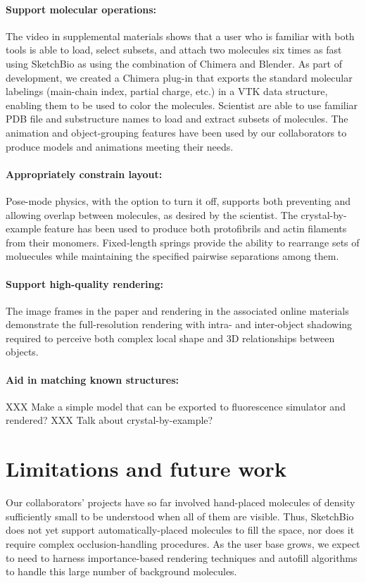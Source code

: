 \documentclass[twocolumn]{bmcart}%
\begin{document}
\paragraph*{Support molecular operations:}
The video in supplemental materials shows that a user who is familiar with both tools is able to load, select subsets, and attach two molecules six times as fast using SketchBio as using the combination of Chimera and Blender. As part of development, we created a Chimera plug-in that exports the standard molecular labelings (main-chain index, partial charge, etc.) in a VTK data structure, enabling them to be used to color the molecules. Scientist are able to use familiar PDB file and substructure names to load and extract subsets of molecules. The animation and object-grouping features have been used by our collaborators to produce models and animations meeting their needs.

\paragraph*{Appropriately constrain layout:}
Pose-mode physics, with the option to turn it off, supports both preventing and allowing overlap between molecules, as desired by the scientist. The crystal-by-example feature has been used to produce both protofibrils and actin filaments from their monomers. Fixed-length springs provide the ability to rearrange sets of moluecules while maintaining the specified pairwise separations among them.

\paragraph*{Support high-quality rendering:}
The image frames in the paper and rendering in the associated online materials demonstrate the full-resolution rendering with intra- and inter-object shadowing required to perceive both complex local shape and 3D relationships between objects.

\paragraph*{Aid in matching known structures:}
XXX Make a simple model that can be exported to fluorescence simulator and rendered?
XXX Talk about crystal-by-example?

\section*{Limitations and future work}
Our collaborators' projects have so far involved hand-placed molecules of density sufficiently small to be understood when all of them are visible.
Thus, SketchBio does not yet support automatically-placed molecules to fill the space, nor does it require complex occlusion-handling procedures.
As the user base grows, we expect to need to harness importance-based rendering techniques and autofill algorithms to handle this large number of background molecules.
\end{document}
